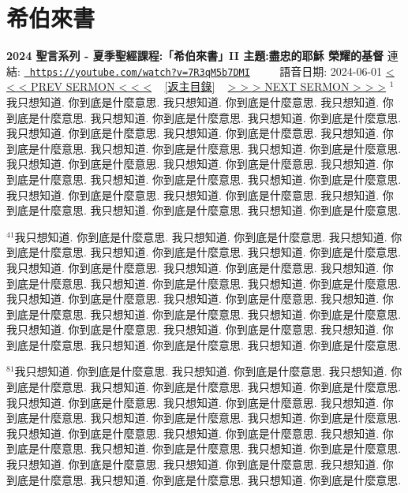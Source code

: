 \documentclass{book}
\begin{document}
\section{希伯來書}
\label{sec:7R3qM5b7DMI}
\textbf{2024 聖言系列 - 夏季聖經課程:「希伯來書」II 主題:盡忠的耶穌 榮耀的基督}
\newline
\newline
連結: \href{https://youtube.com/watch?v=7R3qM5b7DMI}{\texttt{ https://youtube.com/watch?v=7R3qM5b7DMI}} ~~~~ 語音日期: 2024-06-01 
\newline
\newline
\hyperref[sec:iBfE9eVripQ]{\small{< < < PREV SERMON < < <}}
~
\hyperref[sec:index]{\small{[返主目錄]}}
~
\hyperref[sec:wAbpGBqNgNM]{\small{> > > NEXT SERMON > > >}}
\newline
\newline
$^{1}$我只想知道.
你到底是什麼意思.
我只想知道.
你到底是什麼意思.
我只想知道.
你到底是什麼意思.
我只想知道.
你到底是什麼意思.
我只想知道.
你到底是什麼意思.
我只想知道.
你到底是什麼意思.
我只想知道.
你到底是什麼意思.
我只想知道.
你到底是什麼意思.
我只想知道.
你到底是什麼意思.
我只想知道.
你到底是什麼意思.
我只想知道.
你到底是什麼意思.
我只想知道.
你到底是什麼意思.
我只想知道.
你到底是什麼意思.
我只想知道.
你到底是什麼意思.
我只想知道.
你到底是什麼意思.
我只想知道.
你到底是什麼意思.
我只想知道.
你到底是什麼意思.
我只想知道.
你到底是什麼意思.
我只想知道.
你到底是什麼意思.
我只想知道.
你到底是什麼意思.

$^{41}$我只想知道.
你到底是什麼意思.
我只想知道.
你到底是什麼意思.
我只想知道.
你到底是什麼意思.
我只想知道.
你到底是什麼意思.
我只想知道.
你到底是什麼意思.
我只想知道.
你到底是什麼意思.
我只想知道.
你到底是什麼意思.
我只想知道.
你到底是什麼意思.
我只想知道.
你到底是什麼意思.
我只想知道.
你到底是什麼意思.
我只想知道.
你到底是什麼意思.
我只想知道.
你到底是什麼意思.
我只想知道.
你到底是什麼意思.
我只想知道.
你到底是什麼意思.
我只想知道.
你到底是什麼意思.
我只想知道.
你到底是什麼意思.
我只想知道.
你到底是什麼意思.
我只想知道.
你到底是什麼意思.
我只想知道.
你到底是什麼意思.
我只想知道.
你到底是什麼意思.

$^{81}$我只想知道.
你到底是什麼意思.
我只想知道.
你到底是什麼意思.
我只想知道.
你到底是什麼意思.
我只想知道.
你到底是什麼意思.
我只想知道.
你到底是什麼意思.
我只想知道.
你到底是什麼意思.
我只想知道.
你到底是什麼意思.
我只想知道.
你到底是什麼意思.
我只想知道.
你到底是什麼意思.
我只想知道.
你到底是什麼意思.
我只想知道.
你到底是什麼意思.
我只想知道.
你到底是什麼意思.
我只想知道.
你到底是什麼意思.
我只想知道.
你到底是什麼意思.
我只想知道.
你到底是什麼意思.
我只想知道.
你到底是什麼意思.
我只想知道.
你到底是什麼意思.
我只想知道.
你到底是什麼意思.
我只想知道.
你到底是什麼意思.
我只想知道.
你到底是什麼意思.
\end{document}
